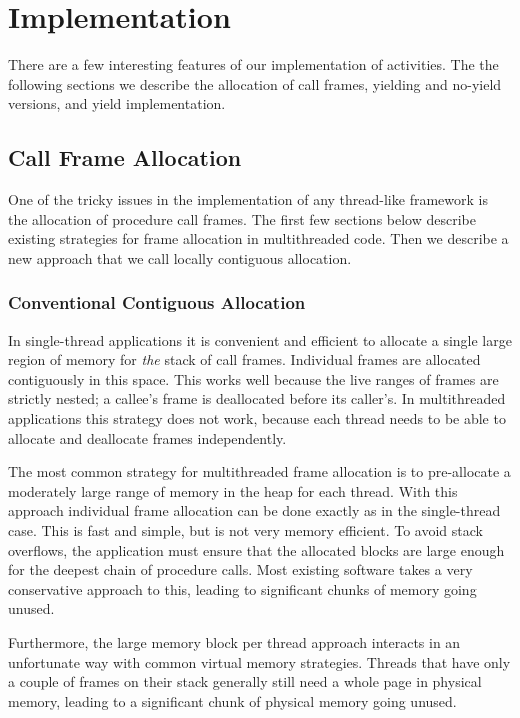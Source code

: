\documentclass[10pt,preprint]{sigplanconf}
\begin{document}
\section{Implementation}

There are a few interesting features of our implementation of activities.
The the following sections we describe the allocation of call frames, yielding and no-yield versions, and yield implementation.

\subsection{Call Frame Allocation}

One of the tricky issues in the implementation of any thread-like framework is the allocation of procedure call frames.
The first few sections below describe existing strategies for frame allocation in multithreaded code.
Then we describe a new approach that we call locally contiguous allocation.

\subsubsection{Conventional Contiguous Allocation}

In single-thread applications it is convenient and efficient to allocate a single large region of memory for \emph{the} stack of call frames.
Individual frames are allocated contiguously in this space.
This works well because the live ranges of frames are strictly nested; a callee's frame is deallocated before its caller's.
In multithreaded applications this strategy does not work, because each thread needs to be able to allocate and deallocate frames independently.

The most common strategy for multithreaded frame allocation is to pre-allocate a moderately large range of memory in the heap for each thread.
With this approach individual frame allocation can be done exactly as in the single-thread case.
This is fast and simple, but is not very memory efficient.
To avoid stack overflows, the application must ensure that the allocated blocks are large enough for the deepest chain of procedure calls.
Most existing software takes a very conservative approach to this, leading to significant chunks of memory going unused.

Furthermore, the large memory block per thread approach interacts in an unfortunate way with common virtual memory strategies.
Threads that have only a couple of frames on their stack generally still need a whole page in physical memory, leading to a significant chunk of physical memory going unused.
\end{document}

